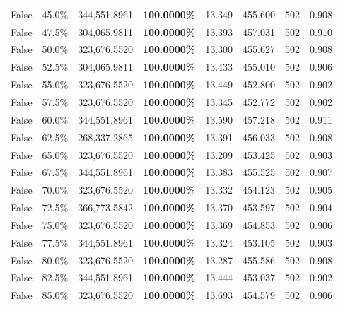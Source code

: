 \begin{table}[H]
{\begin{tabular}{lllrllll}
\cline{1-8}
False & 45.0\% & 344,551.8961 & \bfseries \color{red} 100.0000\% & 13.349 & 455.600 & 502 & 0.908 \\
\cline{1-8}
False & 47.5\% & 304,065.9811 & \bfseries \color{red} 100.0000\% & 13.393 & 457.031 & 502 & 0.910 \\
\cline{1-8}
False & 50.0\% & 323,676.5520 & \bfseries \color{red} 100.0000\% & 13.300 & 455.627 & 502 & 0.908 \\
\cline{1-8}
False & 52.5\% & 304,065.9811 & \bfseries \color{red} 100.0000\% & 13.433 & 455.010 & 502 & 0.906 \\
\cline{1-8}
False & 55.0\% & 323,676.5520 & \bfseries \color{red} 100.0000\% & 13.449 & 452.800 & 502 & 0.902 \\
\cline{1-8}
False & 57.5\% & 323,676.5520 & \bfseries \color{red} 100.0000\% & 13.345 & 452.772 & 502 & 0.902 \\
\cline{1-8}
False & 60.0\% & 344,551.8961 & \bfseries \color{red} 100.0000\% & 13.590 & 457.218 & 502 & 0.911 \\
\cline{1-8}
False & 62.5\% & \color{red} 268,337.2865 & \bfseries \color{red} 100.0000\% & 13.391 & 456.033 & 502 & 0.908 \\
\cline{1-8}
False & 65.0\% & 323,676.5520 & \bfseries \color{red} 100.0000\% & 13.209 & 453.425 & 502 & 0.903 \\
\cline{1-8}
False & 67.5\% & 344,551.8961 & \bfseries \color{red} 100.0000\% & 13.383 & 455.525 & 502 & 0.907 \\
\cline{1-8}
False & 70.0\% & 323,676.5520 & \bfseries \color{red} 100.0000\% & 13.332 & 454.123 & 502 & 0.905 \\
\cline{1-8}
False & 72.5\% & 366,773.5842 & \bfseries \color{red} 100.0000\% & 13.370 & 453.597 & 502 & 0.904 \\
\cline{1-8}
False & 75.0\% & 323,676.5520 & \bfseries \color{red} 100.0000\% & 13.369 & 454.853 & 502 & 0.906 \\
\cline{1-8}
False & 77.5\% & 344,551.8961 & \bfseries \color{red} 100.0000\% & 13.324 & 453.105 & 502 & 0.903 \\
\cline{1-8}
False & 80.0\% & 323,676.5520 & \bfseries \color{red} 100.0000\% & 13.287 & 455.586 & 502 & 0.908 \\
\cline{1-8}
False & 82.5\% & 344,551.8961 & \bfseries \color{red} 100.0000\% & 13.444 & 453.037 & 502 & 0.902 \\
\cline{1-8}
False & 85.0\% & 323,676.5520 & \bfseries \color{red} 100.0000\% & 13.693 & 454.579 & 502 & 0.906 \\

\end{tabular}}
\end{table}
